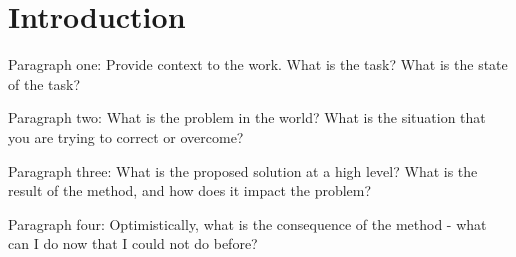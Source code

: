 \section{Introduction}

Paragraph one: Provide context to the work.
What is the task? What is the state of the task?

Paragraph two: What is the problem in the world? What is the situation that you are trying to correct or overcome?

Paragraph three: What is the proposed solution at a high level? What is the result of the method, and how does it impact the problem?

Paragraph four: Optimistically, what is the consequence of the method - what can I do now that I could not do before?